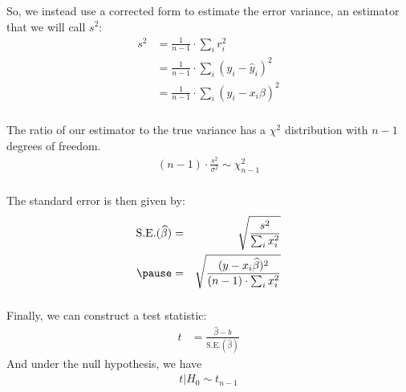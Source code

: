 \begin{frame}[fragile] \frametitle{}

So, we instead use a corrected form to estimate the error
variance, an estimator that we will call $s^2$:
\begin{align*}
s^2 &= \frac{1}{n-1} \cdot \sum_i r_i^2 \\
&= \frac{1}{n-1} \cdot \sum_i (y_i - \widehat{y}_i)^2 \\
&= \frac{1}{n-1} \cdot \sum_i (y_i - x_i \beta)^2
\end{align*}

\end{frame}

\begin{frame}[fragile] \frametitle{}

The ratio of our estimator to the true variance has
a $\chi^2$ distribution with $n-1$ degrees of freedom.
\begin{align*}
(n-1) \cdot \frac{s^2}{\sigma^2} \sim \chi^2_{n - 1}
\end{align*}

\end{frame}

\begin{frame}[fragile] \frametitle{}

The standard error is then given by:
\begin{eqnarray*}
\text{S.E.}(\widehat{\beta}) &=& \sqrt{\frac{s^2}{\sum_i x_i^2}} \\ \pause
&=& \sqrt{\frac{(y - x_i \widehat{\beta})^2}{(n-1) \cdot \sum_i x_i^2}}
\end{eqnarray*}

\end{frame}

\begin{frame}[fragile] \frametitle{}

Finally, we can construct a test statistic:
\begin{align*}
t &= \frac{\widehat{\beta} - b}{\text{S.E.}(\widehat{\beta})}
\end{align*}
\pause And under the null hypothesis, we have
\begin{align*}
t | H_0  \sim t_{n-1}
\end{align*}

\end{frame}

